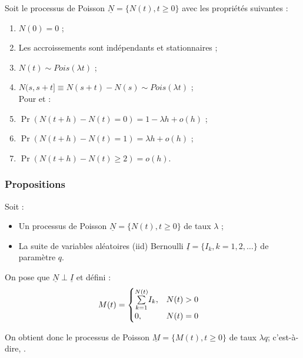 \documentclass[10pt, french]{article}
\begin{document}
\begin{multicols*}{2}
\begin{definitionNOHFILLprop}
Soit le processus de Poisson $\underline{N}	=	\{N(t), t \geq 0\}$ avec les propriétés suivantes :
\begin{enumerate}
	\item	$N(0)	=	0$ ;
	\item	Les accroissements sont indépendants et stationnaires ;
	\item	$N(t)	\sim	Pois(\lambda t)$ ;
	\item	$N(s, s + t]	\equiv N(s + t) - N(s) \sim Pois(\lambda t)$ ;\\
	Pour  et  :
	\item	$\Pr(N(t + h) - N(t) = 0)	=	1 - \lambda h + o(h)$ ;
	\item	$\Pr(N(t + h) - N(t) = 1)	=	\lambda h + o(h)$ ;
	\item	$\Pr(N(t + h) - N(t) \geq 2)	=	o(h)$.
\end{enumerate}
\end{definitionNOHFILLprop}

\subsubsection*{Propositions}
\begin{definitionNOHFILLpropos}
Soit :
\begin{itemize}
	\item	Un processus de Poisson $\underline{N}	=	\{N(t), t \geq 0\}$ de taux $\lambda$ ;
	\item	La suite de variables aléatoires (iid) Bernoulli $\underline{I}	=	\{I_{k}, k	=		1, 2, \dots\}$ de paramètre $q$.
\end{itemize}
On pose que $\underline{N}	\perp	\underline{I}$ et défini :
\begin{align*}
	M(t)
	&=	\begin{cases}
		\overset{N(t)}{\underset{k	=	1}{\sum}} I_{k}, &	N(t)	>	0	\\
		0,	&	N(t)	=	0
		\end{cases}
\end{align*}

On obtient donc le processus de Poisson $\underline{M}	=	\{M(t), t \geq 0\}$ de taux $\lambda q$; c'est-à-dire, .
\end{definitionNOHFILLpropos}


\end{multicols*}
\end{document}
